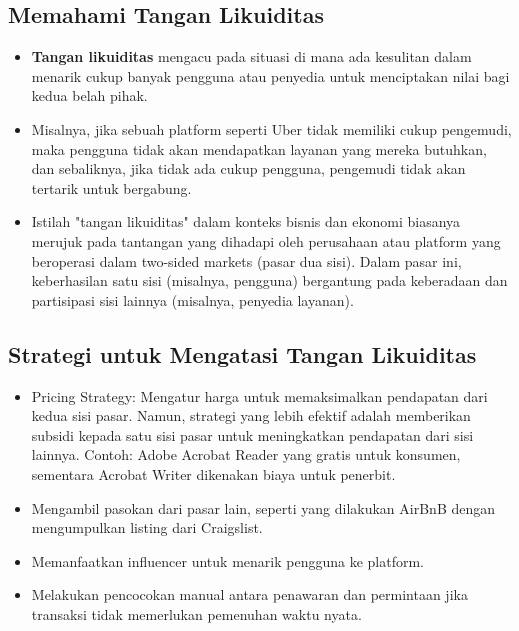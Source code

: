 \documentclass{article}
\begin{document}
\subsection{Memahami Tangan Likuiditas}
\begin{itemize}
    \item \textbf{Tangan likuiditas} mengacu pada situasi di mana ada kesulitan dalam menarik cukup banyak pengguna atau penyedia untuk menciptakan nilai bagi kedua belah pihak.
    \item Misalnya, jika sebuah platform seperti Uber tidak memiliki cukup pengemudi, maka pengguna tidak akan mendapatkan layanan yang mereka butuhkan, dan sebaliknya, jika tidak ada cukup pengguna, pengemudi tidak akan tertarik untuk bergabung.
    \item Istilah "tangan likuiditas" dalam konteks bisnis dan ekonomi biasanya merujuk pada tantangan yang dihadapi oleh perusahaan atau platform yang beroperasi dalam two-sided markets (pasar dua sisi). Dalam pasar ini, keberhasilan satu sisi (misalnya, pengguna) bergantung pada keberadaan dan partisipasi sisi lainnya (misalnya, penyedia layanan).
\end{itemize}

\subsection{Strategi untuk Mengatasi Tangan Likuiditas}
\begin{itemize}
    \item Pricing Strategy: Mengatur harga untuk memaksimalkan pendapatan dari kedua sisi pasar. Namun, strategi yang lebih efektif adalah memberikan subsidi kepada satu sisi pasar untuk meningkatkan pendapatan dari sisi lainnya. Contoh: Adobe Acrobat Reader yang gratis untuk konsumen, sementara Acrobat Writer dikenakan biaya untuk penerbit.
    \item Mengambil pasokan dari pasar lain, seperti yang dilakukan AirBnB dengan mengumpulkan listing dari Craigslist.
    \item Memanfaatkan influencer untuk menarik pengguna ke platform.
    \item Melakukan pencocokan manual antara penawaran dan permintaan jika transaksi tidak memerlukan pemenuhan waktu nyata.
\end{itemize}
\end{document}
